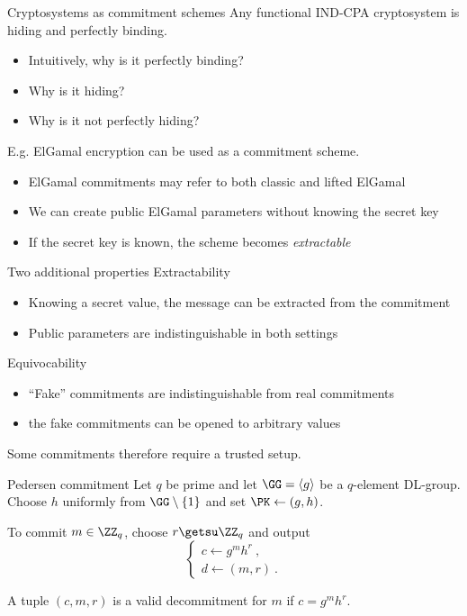 \begin{frame}{Cryptosystems as commitment schemes}
  Any functional IND-CPA cryptosystem is hiding and perfectly binding.
  \begin{itemize}[<+(1)->]
    \item Intuitively, why is it perfectly binding?
    \item Why is it hiding?
    \item Why is it not perfectly hiding?
  \end{itemize}

  \vspace*{1em}

  \pause
  E.g. ElGamal encryption can be used as a commitment scheme.
  \begin{itemize}[<+(1)->]
    \item ElGamal commitments may refer to both classic and lifted ElGamal
    \item We can create public ElGamal parameters without knowing the secret key
    \item If the secret key is known, the scheme becomes \emph{extractable}
  \end{itemize}
\end{frame}

\begin{frame}{Two additional properties}
  Extractability
  \begin{itemize}[<+(1)->]
    \item Knowing a secret value, the message can be extracted from the commitment
    \item Public parameters are indistinguishable in both settings
  \end{itemize}

  \pause
  Equivocability
  \begin{itemize}[<+(1)->]
    \item \enquote{Fake} commitments are indistinguishable from real commitments
    \item the fake commitments can be opened to arbitrary values
  \end{itemize}

  \vspace*{1em}

  \pause
  Some commitments therefore require a trusted setup.
\end{frame}

\begin{frame}{Pedersen commitment}
  Let $q$ be prime and let $\GG = \langle g \rangle$ be a $q$-element DL-group.\\
  Choose $h$ uniformly from $\GG\setminus\{1\}$ and set $\PK \gets (g, h)$.

  \vfill

  \pause
  To commit $m \in \ZZ_q$, choose $r \getsu \ZZ_q$ and output
  \[
    \begin{cases}
      c \gets g^m h^r\ ,\\
      d \gets (m, r)\ .
    \end{cases}
  \]

  \vfill

  \pause
  A tuple $(c, m, r)$ is a valid decommitment for $m$ if $c = g^m h^r$.
\end{frame}


